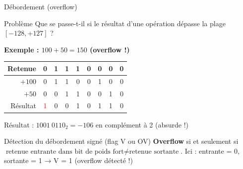\documentclass[aspectratio=1610]{beamer}
\begin{document}
\begin{frame}{Débordement (overflow)}

  \begin{block}{Problème}
    Que se passe-t-il si le résultat d'une opération dépasse la plage $[-128, +127]$ ?
  \end{block}

  \vspace{0.3cm}

  \textbf{Exemple : $100 + 50 = 150$ (overflow !)}

  \begin{center}
    \begin{tabular}{r|cccccccc}
      Retenue & 0 & 1 & 1 & 1 & 0 & 0 & 0 & 0 \\
      \hline
      $+100$ & 0 & 1 & 1 & 0 & 0 & 1 & 0 & 0 \\
      $+50$ & 0 & 0 & 1 & 1 & 0 & 0 & 1 & 0 \\
      \hline
      Résultat & \textcolor{red}{1} & 0 & 0 & 1 & 0 & 1 & 1 & 0 \\
    \end{tabular}
  \end{center}

  \vspace{0.2cm}

  Résultat : $1001\ 0110_2 = -106$ en complément à 2 (absurde !)


  \begin{alertblock}{Détection du débordement signé (flag V ou OV)}
    \textbf{Overflow} si et seulement si $\text{retenue entrante dans bit de poids fort} \neq \text{retenue sortante}$. Ici : entrante = 0, sortante = 1 → V = 1 (overflow détecté !)
  \end{alertblock}

\end{frame}
\end{document}
